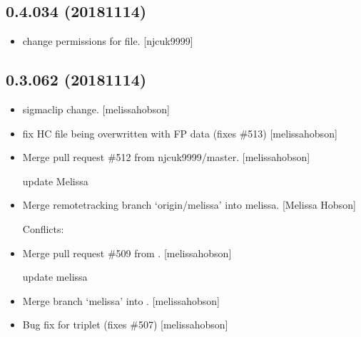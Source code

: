 \documentclass[a4paper,10pt,english]{report}
\begin{document}
\subsection{0.4.034 (2018\sphinxhyphen{}11\sphinxhyphen{}14)}
\label{\detokenize{misc/changelog:id280}}\begin{itemize}
\item {} 
 \sphinxhyphen{} change permissions for file. {[}njcuk9999{]}

\end{itemize}


\subsection{0.3.062 (2018\sphinxhyphen{}11\sphinxhyphen{}14)}
\label{\detokenize{misc/changelog:id281}}\begin{itemize}
\item {} 
 sigma\sphinxhyphen{}clip change. {[}melissa\sphinxhyphen{}hobson{]}

\item {} 
 \sphinxhyphen{} fix HC file being overwritten with FP data (fixes
\#513) {[}melissa\sphinxhyphen{}hobson{]}

\item {} 
Merge pull request \#512 from njcuk9999/master. {[}melissa\sphinxhyphen{}hobson{]}

update Melissa

\item {} 
Merge remote\sphinxhyphen{}tracking branch ‘origin/melissa’ into melissa. {[}Melissa
Hobson{]}
\begin{description}
\item[{Conflicts:}] \leavevmode
{}

\end{description}

\item {} 
Merge pull request \#509 from . {[}melissa\sphinxhyphen{}hobson{]}

update melissa

\item {} 
Merge branch ‘melissa’ into . {[}melissa\sphinxhyphen{}hobson{]}

\item {} 
Bug fix for  triplet (fixes \#507) {[}melissa\sphinxhyphen{}hobson{]}

\end{itemize}
\end{document}
